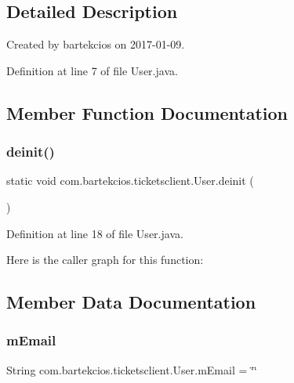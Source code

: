 \subsection{Detailed Description}
Created by bartekcios on 2017-\/01-\/09. 

Definition at line 7 of file User.\+java.



\subsection{Member Function Documentation}
\mbox{\label{classcom_1_1bartekcios_1_1ticketsclient_1_1_user_ad78c696395812394db5d5d580ab1f8f1}} 
\subsubsection{\texorpdfstring{deinit()}{deinit()}}
{\footnotesize\ttfamily static void com.\+bartekcios.\+ticketsclient.\+User.\+deinit (\begin{DoxyParamCaption}{ }\end{DoxyParamCaption})\hspace{0.3cm}{\ttfamily [static]}}



Definition at line 18 of file User.\+java.

Here is the caller graph for this function\+:


\subsection{Member Data Documentation}
\mbox{\label{classcom_1_1bartekcios_1_1ticketsclient_1_1_user_ab83ccd7070a97bb3a47c6acccab1dd28}} 
\subsubsection{\texorpdfstring{m\+Email}{mEmail}}
{\footnotesize\ttfamily String com.\+bartekcios.\+ticketsclient.\+User.\+m\+Email = \char`\"{}\char`\"{}\hspace{0.3cm}{\ttfamily [static]}}




